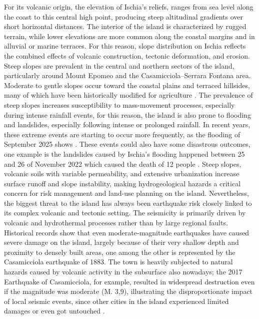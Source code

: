 \documentclass[10pt, twocolumn, twoside]{article}
\begin{document}
For its volcanic origin, the elevation of Ischia’s reliefs, ranges from sea level along the coast to this central high point, producing steep altitudinal gradients over short horizontal distances. The interior of the island is characterized by rugged terrain, while lower elevations are more common along the coastal margins and in alluvial or marine terraces. For this reason, slope distribution on Ischia reflects the combined effects of volcanic construction, tectonic deformation, and erosion. Steep slopes are prevalent in the central and northern sectors of the island, particularly around Mount Epomeo and the Casamicciola–Serrara Fontana area. Moderate to gentle slopes occur toward the coastal plains and terraced hillsides, many of which have been historically modified for agriculture \cite{Vezzoli1988Ischia}. The prevalence of steep slopes increases susceptibility to mass-movement processes, especially during intense rainfall events, for this reason, the island is also prone to flooding and landslides, especially following intense or prolonged rainfall. In recent years, these extreme events are starting to occur more frequently, as the flooding of September 2025 shows \cite{ansa}. These events could also have some disastrous outcomes, one example is the landslides caused by Ischia’s flooding happened between 25 and 26 of November 2022 which caused the death of 12 people \cite{ISPRA2022Ischia}. Steep slopes, volcanic soils with variable permeability, and extensive urbanization increase surface runoff and slope instability, making hydrogeological hazards a critical concern for risk management and land-use planning on the island. 
Nevertheless, the biggest threat to the island has always been earthquake risk closely linked to its complex volcanic and tectonic setting. The seismicity is primarily driven by volcanic and hydrothermal processes rather than by large regional faults. Historical records show that even moderate-magnitude earthquakes have caused severe damage on the island, largely because of their very shallow depth and proximity to densely built areas, one among the other is represented by the Casamicciola earthquake of 1883. The town is heavily subjected to natural hazards caused by volcanic activity in the subsurface also nowadays; the 2017 Earthquake of Casamicciola, for example, resulted in widespread destruction even if the magnitude was moderate (M. 3,9), illustrating the disproportionate impact of local seismic events, since other cities in the island experienced limited damages or even got untouched \cite{DeNatale2019Ischia}. 
\end{document}
